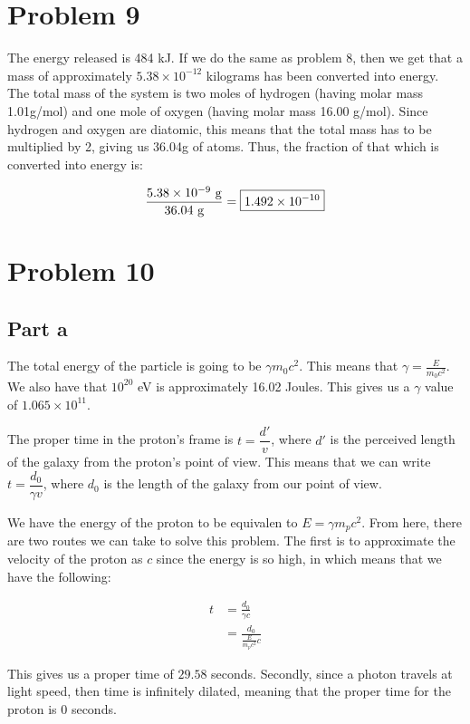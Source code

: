 \documentclass{article}
\theoremstyle{definition}
\numberwithin{equation}{section}
\numberwithin{definition}{section}
\begin{document}
	\section{Problem 9}
	
	The energy released is 484 kJ. If we do the same as problem 8, then we get that a mass of approximately $5.38 \times 10^{-12}$ kilograms has been converted into energy. The total mass of the system is two moles of hydrogen (having molar mass 1.01g/mol) and one mole of oxygen (having molar mass 16.00 g/mol). Since hydrogen and oxygen are diatomic, this means that the total mass has to be multiplied by 2, giving us 36.04g of atoms. Thus, the fraction of that which is converted into energy is:
	
	\[\frac{5.38\times 10^{-9} \ \text{g}}{36.04 \ \text g} = \boxed{1.492\times 10^{-10}}\]
	
	\section{Problem 10} 
	\subsection{Part a} 
	The total energy of the particle is going to be $\gamma m_0c^2$. This means that $\gamma = \frac{E}{m_0c^2}$. We also have that $10^{20}$ eV is approximately 16.02 Joules. This gives us a $\gamma$ value of $1.065 \times 10^{11}$.
	
	\medskip
	
	The proper time in the proton's frame is $t = \dfrac{d'}{v}$, where $d'$ is the perceived length of the galaxy from the proton's point of view. This means that we can write $t = \dfrac{d_0}{\gamma v}$, where $d_0$ is the length of the galaxy from our point of view. 
	
	\medskip
	
	We have the energy of the proton to be equivalen to $E = \gamma m_pc^2$. From here, there are two routes we can take to solve this problem. The first is to approximate the velocity of the proton as $c$ since the energy is so high, in which means that we have the following:
	
	\begin{align*}
		t &= \frac{d_0}{\gamma c}\\
		&= \frac{d_0}{\frac{E}{m_pc^2} c}
	\end{align*}

	This gives us a proper time of $\boxed{29.58}$ seconds. Secondly, since a photon travels at light speed, then time is infinitely dilated, meaning that the proper time for the proton is 0 seconds.
	
\end{document}
